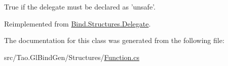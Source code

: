True if the delegate must be declared as 'unsafe'. 



Reimplemented from \hyperlink{class_bind_1_1_structures_1_1_delegate_aae33530792e1146d9cd50363f7759da9}{Bind.Structures.Delegate}.



The documentation for this class was generated from the following file:\begin{DoxyCompactItemize}
\item 
src/Tao.GlBindGen/Structures/\hyperlink{_function_8cs}{Function.cs}\end{DoxyCompactItemize}
